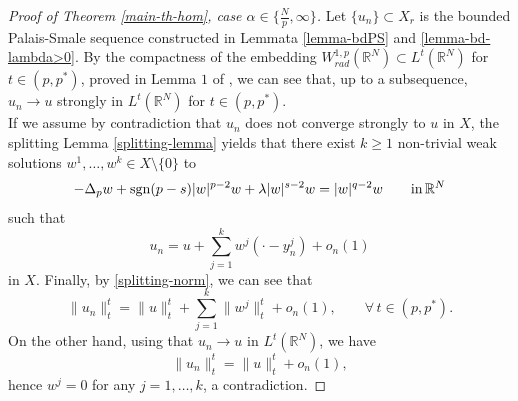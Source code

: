 \documentclass[11pt,reqno]{amsart}
\theoremstyle{definition}
\numberwithin{equation}{section}
\numberwithin{theorem}{section}
\numberwithin{equation}{section}
\numberwithin{theorem}{section}
\newcommand{\R}{\mathbb{R}}
\begin{document}
\begin{proof}[Proof of Theorem \ref{main-th-hom}, case $\alpha\in\{\frac{N}{p},\infty\}$]
Let $\{u_n\}\subset X_r$ is the bounded Palais-Smale sequence constructed in Lemmata \ref{lemma-bdPS} and \ref{lemma-bd-lambda>0}. By the compactness of the embedding $W^{1,p}_{rad}(\R^N)\subset L^t(\R^N)$ for $t\in(p,p^*)$, proved in Lemma $1$ of \cite{dhara2025normalised}, we can see that, up to a subsequence, $u_n\to u$ strongly in $L^t(\R^N)$ for $t\in(p,p^*)$.\\

If we assume by contradiction that $u_n$ does not converge strongly to $u$ in $X$, the splitting Lemma \ref{splitting-lemma} yields that there exist $k\ge 1$ non-trivial weak solutions $w^1,\dots, w^k\in X\setminus\{0\}$ to
$$-\Delta_p w+{\rm sgn}(p-s)|w|^{p-2}w+\lambda |w|^{s-2}w=|w|^{q-2}w\qquad\text{in}\,\R^N$$
such that
$$u_n=u+\sum_{j=1}^k w^j(\cdotp-y^j_n)+o_n(1)$$
in $X$. Finally, by \eqref{splitting-norm}, we can see that 
$$\|u_n\|^t_t=\|u\|^t_t+\sum_{j=1}^k \|w^j\|^t_t+o_n(1),\qquad\forall\, t\in(p,p^*).$$
On the other hand, using that $u_n\to u$ in $L^t(\R^N)$, we have
$$\|u_n\|^t_t=\|u\|^t_t+o_n(1),$$
hence $w^j=0$ for any $j=1,\dots,k$, a contradiction.
\end{proof}



\end{document}
